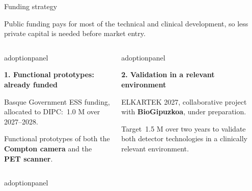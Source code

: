 \documentclass[aspectratio=169,11pt]{beamer}
\newcommand{\hi}[1]{\textcolor{crRed}{#1}}
\begin{document}
\begin{frame}{Funding strategy}

{\small Public funding pays for most of the technical and clinical development, \hi{so less private capital is needed before market entry}.\par}
\vspace{0.16cm}
\begin{columns}[T,onlytextwidth]
\begin{beamercolorbox}[sep=6pt,wd=\linewidth]{adoptionpanel}
\begin{minipage}[t][2.0cm][t]{\linewidth}\raggedright
{\footnotesize\bfseries\color{crBlue}1. Functional prototypes: already funded\par}
\vspace{0.07cm}
{\scriptsize Basque Government ESS funding, \hi{allocated to DIPC}: \EUR\,1.0 M over 2027--2028.\par\vspace{0.06cm}
Functional prototypes of both the \textbf{Compton camera} and the \textbf{PET scanner}.\par}
\end{minipage}
\end{beamercolorbox}
\begin{beamercolorbox}[sep=6pt,wd=\linewidth]{adoptionpanel}
\begin{minipage}[t][2.0cm][t]{\linewidth}\raggedright
{\footnotesize\bfseries\color{crBlue}2. Validation in a relevant environment\par}
\vspace{0.07cm}
{\scriptsize ELKARTEK 2027, collaborative project with \textbf{BioGipuzkoa}, under preparation.\par\vspace{0.06cm}
Target \EUR\,1.5 M over two years to validate both detector technologies in a clinically relevant environment.\par}
\end{minipage}
\end{beamercolorbox}
\end{columns}
\par\vspace{0.20cm}
\begin{columns}[T,onlytextwidth]
\begin{beamercolorbox}[sep=6pt,wd=\linewidth]{adoptionpanel}
\begin{minipage}[t][2.0cm][t]{\linewidth}\raggedright

\end{minipage}
\end{beamercolorbox}
\end{columns}
\end{frame}
\end{document}
